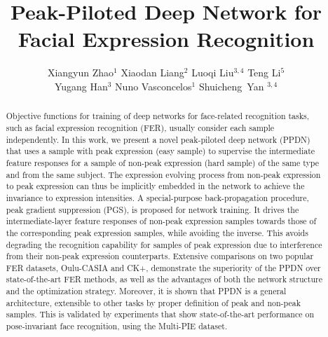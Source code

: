 \documentclass[runningheads]{llncs}
\begin{document}
\pagestyle{headings}
\mainmatter


\title{Peak-Piloted Deep Network for Facial Expression Recognition} 

\author{Xiangyun Zhao$^{1}$ \quad Xiaodan Liang$^{2}$ \quad Luoqi Liu$^{3,4}$ \quad Teng Li$^{5}$\\ \quad Yugang Han$^{3}$ \quad Nuno Vasconcelos$^{1}$ \quad Shuicheng~Yan $^{3,4}$}



\maketitle

\begin{abstract}
	
Objective functions for training of deep networks for face-related 
recognition tasks, such as facial expression recognition (FER), usually 
consider each sample independently. In this work, we present a novel 
peak-piloted deep network (PPDN) that uses a sample with peak 
expression (easy sample) to supervise the intermediate feature responses
for a sample of non-peak expression (hard sample) of the same type and from 
the same subject. The expression
evolving process from non-peak expression to peak expression can thus be
implicitly embedded in the network to achieve the invariance to expression intensities. A special-purpose back-propagation procedure, peak gradient
suppression (PGS), is proposed for network training. It drives the 
intermediate-layer feature responses of non-peak expression samples
towards those of the corresponding peak expression samples, while
avoiding the inverse. This avoids degrading the recognition capability for 
samples of peak expression due to interference from their non-peak expression 
counterparts. Extensive comparisons on two popular FER datasets, Oulu-CASIA
and CK+, demonstrate the superiority of the PPDN over state-of-the-art 
FER methods, as well as the advantages of both the network structure and 
the optimization strategy. Moreover, it is shown that PPDN is
a general architecture, extensible to other tasks by proper definition of 
peak and non-peak samples. This is validated by experiments that
show state-of-the-art performance on pose-invariant face recognition,
using the Multi-PIE dataset.


\end{abstract}
\end{document}
